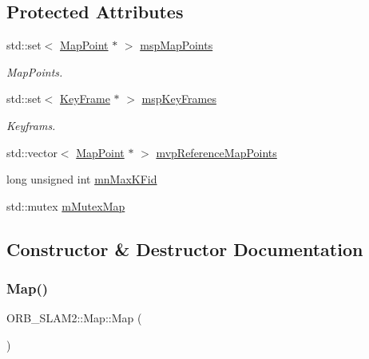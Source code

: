\subsection*{Protected Attributes}
\begin{DoxyCompactItemize}
\item 
std\+::set$<$ \mbox{\hyperlink{class_o_r_b___s_l_a_m2_1_1_map_point}{Map\+Point}} $\ast$ $>$ \mbox{\hyperlink{class_o_r_b___s_l_a_m2_1_1_map_a2864c4d90418f02768c85d0255d1eca7}{msp\+Map\+Points}}
\begin{DoxyCompactList}\small\item\em Map\+Points. \end{DoxyCompactList}\item 
std\+::set$<$ \mbox{\hyperlink{class_o_r_b___s_l_a_m2_1_1_key_frame}{Key\+Frame}} $\ast$ $>$ \mbox{\hyperlink{class_o_r_b___s_l_a_m2_1_1_map_abf1d31c2cb4df61d232bb7fbd7cfb61d}{msp\+Key\+Frames}}
\begin{DoxyCompactList}\small\item\em Keyframs. \end{DoxyCompactList}\item 
std\+::vector$<$ \mbox{\hyperlink{class_o_r_b___s_l_a_m2_1_1_map_point}{Map\+Point}} $\ast$ $>$ \mbox{\hyperlink{class_o_r_b___s_l_a_m2_1_1_map_ad1d98a7e8207b995494afa7c098a7aaf}{mvp\+Reference\+Map\+Points}}
\item 
long unsigned int \mbox{\hyperlink{class_o_r_b___s_l_a_m2_1_1_map_abfafaf7ca3821cb069cb95fb88c91dfc}{mn\+Max\+K\+Fid}}
\item 
std\+::mutex \mbox{\hyperlink{class_o_r_b___s_l_a_m2_1_1_map_a86b9fb9d5c601fb6fd88c46444bd553c}{m\+Mutex\+Map}}
\end{DoxyCompactItemize}


\subsection{Constructor \& Destructor Documentation}
\mbox{\label{class_o_r_b___s_l_a_m2_1_1_map_a1ab4040dee1287a387124b7d52ac8a02}} 
\subsubsection{\texorpdfstring{Map()}{Map()}}
{\footnotesize\ttfamily O\+R\+B\+\_\+\+S\+L\+A\+M2\+::\+Map\+::\+Map (\begin{DoxyParamCaption}{ }\end{DoxyParamCaption})}



